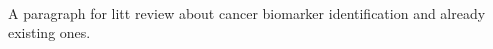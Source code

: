 \documentclass[11pt]{article}
\begin{document}
~ %
\par A paragraph for litt review about cancer biomarker identification and already existing ones.

\par  
\end{document}

